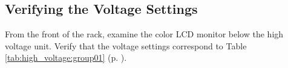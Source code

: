 \subsection{Verifying the Voltage Settings}
\label{sec:op_high_voltage:verify_voltage}

From the front of the rack, examine the color LCD monitor below the high voltage unit.  Verify that the voltage settings correspond to Table \ref{tab:high_voltage:group01} (p. \pageref{tab:high_voltage:group01}).

